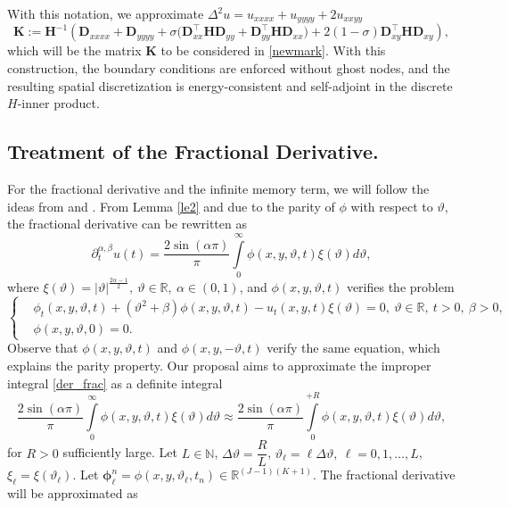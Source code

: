 \documentclass[12pt]{article}
\numberwithin{equation}{section}
\begin{document}
\medskip
\noindent
With this notation, we approximate $\Delta^2 u = u_{xxxx}+u_{yyyy}+2u_{xxyy}$
\begin{equation}\label{bilap}
\boldsymbol K
:= \boldsymbol{H}^{-1}\left(
\boldsymbol D_{xxxx} + \boldsymbol{D}_{yyyy}
+ \sigma\big(\boldsymbol{D}_{xx}^\top \boldsymbol{H} \boldsymbol{D}_{yy}+\boldsymbol{D}_{yy}^\top \boldsymbol{H} \boldsymbol{D}_{xx}\big)
+2(1-\sigma)\boldsymbol{D}_{xy}^\top \boldsymbol{H} \boldsymbol{D}_{xy}\right),
\end{equation}
which will be the matrix $\boldsymbol{K}$ to be considered in \eqref{newmark}. With this construction, the boundary conditions are enforced without ghost nodes, and the resulting spatial discretization is energy-consistent and self-adjoint in the discrete $H$-inner product.
\subsection{Treatment of the Fractional Derivative.}
For the fractional derivative and the infinite memory term, we will follow the ideas from \cite{aslam25} and \cite{ammari25}. From Lemma \ref{le2} and due to the parity of $\phi$ with respect to $\vartheta$, the fractional derivative can be rewritten as
\begin{equation}\label{der_frac}
\partial_t^{\alpha,\beta}u(t) = \dfrac{2\sin(\alpha \pi)}{\pi}\int\limits_{0}^{\infty}\phi(x,y,\vartheta,t)\xi(\vartheta) d\vartheta,
\end{equation}
where $\xi(\vartheta) = |\vartheta|^{\frac{2\alpha - 1}{2}},\: \vartheta \in \mathbb{R},\: \alpha \in (0,1)$, and $\phi(x,y,\vartheta,t)$ verifies the problem
\begin{equation}\label{pvi_phi}
\begin{cases}
    &\phi_t(x,y,\vartheta,t)+(\vartheta^2 + \beta)\phi (x,y,\vartheta,t) - u_t(x,y,t)\xi(\vartheta) = 0,\: \vartheta \in \mathbb{R},\: t>0,\: \beta > 0, \\
    & \phi (x,y,\vartheta,0) = 0.
\end{cases}
\end{equation}
Observe that $\phi(x,y,\vartheta,t)$ and $\phi(x,y,-\vartheta,t)$ verify the same equation, which explains the parity property. Our proposal aims to approximate the improper integral \eqref{der_frac} as a definite integral
\[
\dfrac{2\sin(\alpha \pi)}{\pi}\int\limits_{0}^{\infty}\phi(x,y,\vartheta,t)\xi(\vartheta) d\vartheta \approx \dfrac{2\sin(\alpha \pi)}{\pi}\int\limits_{0}^{+R}\phi(x,y,\vartheta,t)\xi(\vartheta) d\vartheta ,
\]
for $R>0$ sufficiently large. Let $L\in \mathbb{N}$, $\Delta \vartheta = \dfrac{R}{L}$, $\vartheta_\ell = \ell \Delta \vartheta,\: \ell = 0,1,\dots, L$, $\xi_\ell = \xi(\vartheta_\ell)$. Let $\boldsymbol{\phi}_\ell^n = \phi(x,y,\vartheta_\ell,t_n) \in \mathbb{R}^{(J-1)(K+1)}$. The fractional derivative will be approximated as 
\end{document}
